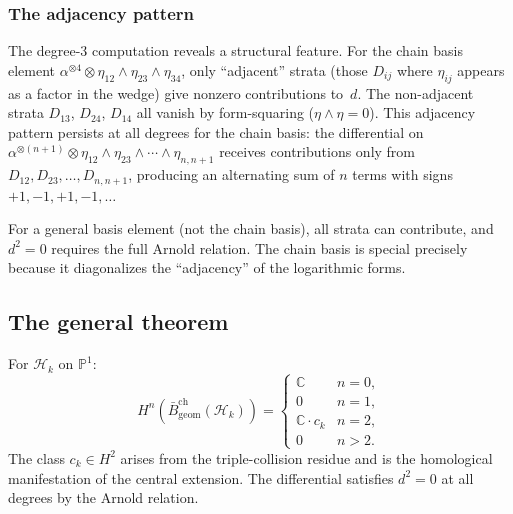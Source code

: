 \subsubsection*{The adjacency pattern}

The degree-$3$ computation reveals a structural feature. For
the chain basis element
$\alpha^{\otimes 4} \otimes \eta_{12} \wedge \eta_{23} \wedge \eta_{34}$,
only ``adjacent'' strata (those $D_{ij}$ where $\eta_{ij}$ appears
as a factor in the wedge) give nonzero contributions to~$d$.
The non-adjacent strata $D_{13}$, $D_{24}$, $D_{14}$ all vanish
by form-squaring ($\eta \wedge \eta = 0$). This adjacency
pattern persists at all degrees for the chain basis: the
differential on
$\alpha^{\otimes(n+1)} \otimes \eta_{12} \wedge \eta_{23}
\wedge \cdots \wedge \eta_{n,n+1}$
receives contributions only from $D_{12}, D_{23}, \ldots, D_{n,n+1}$,
producing an alternating sum of $n$ terms with signs
$+1, -1, +1, -1, \ldots\,$

For a general basis element (not the chain basis), all strata can
contribute, and $d^2 = 0$ requires the full Arnold relation.
The chain basis is special precisely because it diagonalizes the
``adjacency'' of the logarithmic forms.

\subsection{The general theorem}

\begin{theorem}
\label{thm:frame-heisenberg-bar}
For $\mathcal{H}_k$ on $\mathbb{P}^1$:
\begin{equation}\label{eq:frame-heisenberg-bar-cohomology}
H^n(\bar{B}^{\mathrm{ch}}_{\mathrm{geom}}(\mathcal{H}_k))
= \begin{cases}
\mathbb{C} & n = 0, \\
0 & n = 1, \\
\mathbb{C} \cdot c_k & n = 2, \\
0 & n > 2.
\end{cases}
\end{equation}
The class $c_k \in H^2$ arises from the triple-collision residue
and is the homological manifestation of the central extension.
The differential satisfies $d^2 = 0$ at all degrees by the
Arnold relation.
\end{theorem}

